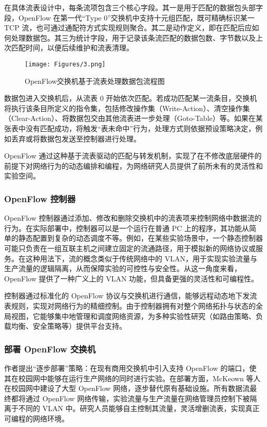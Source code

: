 \documentclass{article}
\begin{document}
在具体流表设计中，每条流项包含三个核心字段。其一是用于匹配的数据包头部字段，OpenFlow 在第一代“Type 0”交换机中支持十元组匹配，既可精确标识某一 TCP 流，也可通过通配符方式实现规则聚合。其二是动作定义，即在匹配后应如何处理数据包。其三为统计字段，用于记录该条流匹配的数据包数、字节数以及上次匹配时间，以便后续维护和流表清理。
\begin{figure}[h]
    \centering
    \texttt{[image: Figures/3.png]}
    \caption{OpenFlow交换机基于流表处理数据包流程图\cite{sdnn}}
\end{figure}

数据包进入交换机后，从流表 0 开始依次匹配。若成功匹配某一流条目，交换机将执行该条目所定义的指令集，包括修改操作集（Write-Action）、清空操作集（Clear-Action）、将数据包交由其他流表进一步处理（Goto-Table）等。如果在某张表中没有匹配成功，将触发“表未命中”行为，处理方式则依据预设策略决定，例如丢弃或将数据包发送至控制器进行处理。


OpenFlow 通过这种基于流表驱动的匹配与转发机制，实现了在不修改底层硬件的前提下对网络行为的动态编排和编程，为网络研究人员提供了前所未有的灵活性和实验空间。


\subsubsection{\textbf{OpenFlow 控制器}}
\quad\quad OpenFlow 控制器通过添加、修改和删除交换机中的流表项来控制网络中数据流的行为。在实际部署中，控制器可以是一个运行在普通 PC 上的程序，其功能从简单的静态配置到复杂的动态调度不等。例如，在某些实验场景中，一个静态控制器可能只负责在一组互联主机之间建立固定的流通路径，用于模拟新的网络协议或服务。在这种用法下，流的概念类似于传统网络中的 VLAN，用于实现实验流量与生产流量的逻辑隔离，从而保障实验的可控性与安全性。从这一角度来看，OpenFlow 提供了一种广义上的 VLAN 功能，但具备更强的灵活性和可编程性。

控制器通过标准化的 OpenFlow 协议与交换机进行通信，能够远程动态地下发流表规则，实现对网络行为的精细控制。由于控制器拥有对整个网络拓扑与状态的全局视图，它能够集中地管理和调度网络资源，为多种实验性研究（如路由策略、负载均衡、安全策略等）提供平台支持。


\subsubsection{\textbf{部署 OpenFlow 交换机}}

\quad\quad 作者提出“逐步部署”策略：在现有商用交换机中引入支持 OpenFlow 的端口，使其在校园网中能够在运行生产网络的同时进行实验。在部署方面，McKeown 等人在校园网中建设了大型 OpenFlow 网络，逐步替代原有基础设施。所有数据流最终都将通过 OpenFlow 网络传输，实验流量与生产流量在网络管理员控制下被隔离于不同的 VLAN 中。研究人员能够自主控制其流量，灵活增删流表，实现真正可编程的网络环境。
\end{document}
